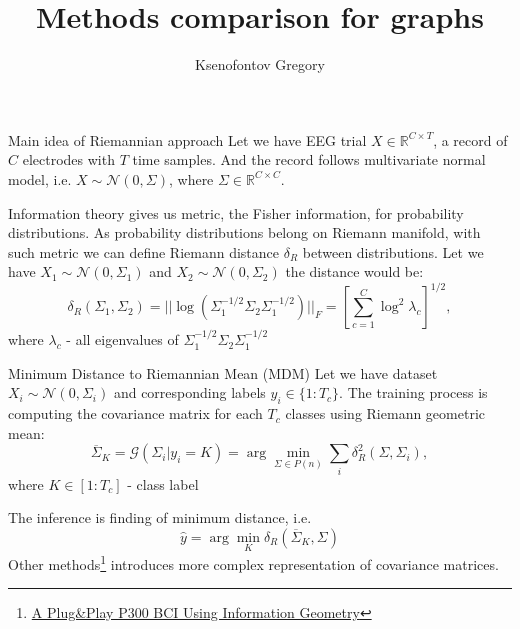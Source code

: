 \documentclass{beamer}
\title{Methods comparison for graphs}
\author{Ksenofontov Gregory}
\institute{MIPT}
\begin{document}
\begin{frame}
    \titlepage
\end{frame}

\begin{frame}{Main idea of Riemannian approach}
        Let we have EEG trial $X\in\mathbb{R}^{C\times T}$, a record of  $C$  electrodes with $T$ time samples. And the record follows multivariate normal model, i.e. $X \sim \mathcal{N}(0, \Sigma)$, where $\Sigma\in \mathbb{R}^{C\times C}$. \par
        Information theory gives us metric, the Fisher information, for probability distributions. As probability distributions belong on Riemann manifold, with such metric we can define Riemann distance $\delta_R$ between distributions. Let we have $X_1 \sim \mathcal{N}(0, \Sigma_1)$ and $X_2 \sim \mathcal{N}(0, \Sigma_2)$ the distance would be:
        \begin{equation}
            \delta_R(\Sigma_1, \Sigma_2)=||\log(\Sigma_1^{-1/2}\Sigma_2\Sigma_1^{-1/2})||_F = \left[ \sum_{c=1}^C\log^2\lambda_c\right]^{1/2},
    \end{equation}
    where $\lambda_c$ - all eigenvalues of $\Sigma_1^{-1/2}\Sigma_2\Sigma_1^{-1/2}$
\end{frame}
\begin{frame}{Minimum Distance to Riemannian Mean (MDM)}
    Let we have dataset $X_i \sim \mathcal{N}(0, \Sigma_i)$ and corresponding labels $y_i\in\{1:T_c\}$. The training process is computing the covariance matrix for each  $T_c$ classes using Riemann geometric mean:
    \begin{equation}
      \overline{\Sigma}_K = \mathcal{G}(\Sigma_i|y_i=K) = \arg\min_{\Sigma\in P(n)}\sum_i\delta_R^2(\Sigma, \Sigma_i),
  \end{equation}
  where $K\in [1:T_c]$ - class label \par
  The inference is finding of minimum distance, i.e.
  \begin{equation}
   \hat y = \arg\min_K\delta_R(\overline{\Sigma}_K, \Sigma)   
 \end{equation}
 Other methods\footnote{\href{https://arxiv.org/pdf/1409.0107.pdf}{A Plug\&Play P300 BCI Using Information Geometry}} introduces more complex representation of covariance matrices. 
\end{frame}
\end{document}
